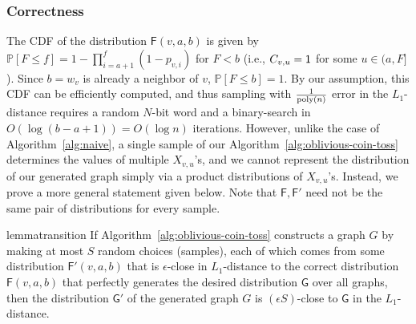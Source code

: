 \iffalse
\subsubsection{Correctness}

The CDF of the distribution $\mathsf{F}(v,a,b)$ is given by $\mathbb P[F \leq f] = 1-\prod_{i=a+1}^{f} (1-p_{v,i})$ for $F<b$
(i.e., $C_{v,u} = \mathsf{1}$ for some $u \in (a,F]$).
Since $b=w_v$ is already a neighbor of $v$, $\mathbb P[F \leq b] = 1$.
By our assumption, this CDF can be efficiently computed, and thus sampling with $\frac{1}{\mathrm{poly}(n)}$ error in the $L_1$-distance requires a random $N$-bit word and a binary-search in $O(\log (b-a+1)) = O(\log n)$ iterations.
However, unlike the case of Algorithm~\ref{alg:naive}, a single sample of our Algorithm~\ref{alg:oblivious-coin-toss} determines the values of multiple $X_{v,u}$'s, and we cannot represent the distribution of our generated graph simply via a product distributions of $X_{v,u}$'s.
Instead, we prove a more general statement given below.
Note that $\mathsf{F}, \mathsf{F}'$ need not be the same pair of distributions for every sample.
\begin{restatable}{lemma}{transition}\label{lemma:transition}
If Algorithm~\ref{alg:oblivious-coin-toss} constructs a graph $G$ by making at most $S$ random choices (samples), each of which comes from some distribution $\mathsf{F}'(v,a,b)$ that is $\epsilon$-close in $L_1$-distance to the correct distribution $\mathsf{F}(v,a,b)$ that perfectly generates the desired distribution $\mathsf{G}$ over all graphs, then the distribution $\mathsf{G}'$ of the generated graph $G$ is $(\epsilon S)$-close to $\mathsf{G}$ in the $L_1$-distance.
\end{restatable}

